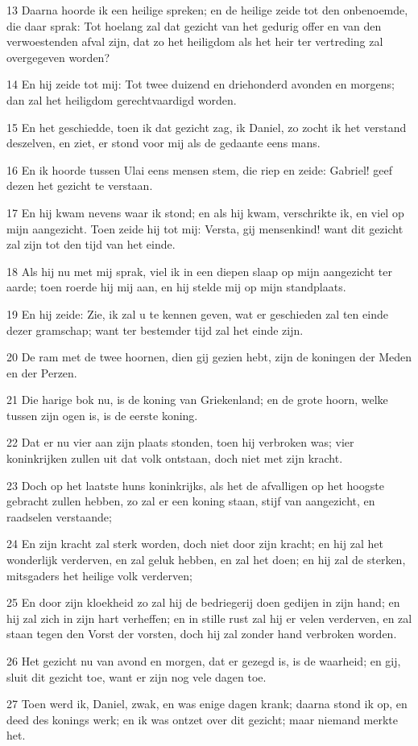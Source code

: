 \par 13 Daarna hoorde ik een heilige spreken; en de heilige zeide tot den onbenoemde, die daar sprak: Tot hoelang zal dat gezicht van het gedurig offer en van den verwoestenden afval zijn, dat zo het heiligdom als het heir ter vertreding zal overgegeven worden?
\par 14 En hij zeide tot mij: Tot twee duizend en driehonderd avonden en morgens; dan zal het heiligdom gerechtvaardigd worden.
\par 15 En het geschiedde, toen ik dat gezicht zag, ik Daniel, zo zocht ik het verstand deszelven, en ziet, er stond voor mij als de gedaante eens mans.
\par 16 En ik hoorde tussen Ulai eens mensen stem, die riep en zeide: Gabriel! geef dezen het gezicht te verstaan.
\par 17 En hij kwam nevens waar ik stond; en als hij kwam, verschrikte ik, en viel op mijn aangezicht. Toen zeide hij tot mij: Versta, gij mensenkind! want dit gezicht zal zijn tot den tijd van het einde.
\par 18 Als hij nu met mij sprak, viel ik in een diepen slaap op mijn aangezicht ter aarde; toen roerde hij mij aan, en hij stelde mij op mijn standplaats.
\par 19 En hij zeide: Zie, ik zal u te kennen geven, wat er geschieden zal ten einde dezer gramschap; want ter bestemder tijd zal het einde zijn.
\par 20 De ram met de twee hoornen, dien gij gezien hebt, zijn de koningen der Meden en der Perzen.
\par 21 Die harige bok nu, is de koning van Griekenland; en de grote hoorn, welke tussen zijn ogen is, is de eerste koning.
\par 22 Dat er nu vier aan zijn plaats stonden, toen hij verbroken was; vier koninkrijken zullen uit dat volk ontstaan, doch niet met zijn kracht.
\par 23 Doch op het laatste huns koninkrijks, als het de afvalligen op het hoogste gebracht zullen hebben, zo zal er een koning staan, stijf van aangezicht, en raadselen verstaande;
\par 24 En zijn kracht zal sterk worden, doch niet door zijn kracht; en hij zal het wonderlijk verderven, en zal geluk hebben, en zal het doen; en hij zal de sterken, mitsgaders het heilige volk verderven;
\par 25 En door zijn kloekheid zo zal hij de bedriegerij doen gedijen in zijn hand; en hij zal zich in zijn hart verheffen; en in stille rust zal hij er velen verderven, en zal staan tegen den Vorst der vorsten, doch hij zal zonder hand verbroken worden.
\par 26 Het gezicht nu van avond en morgen, dat er gezegd is, is de waarheid; en gij, sluit dit gezicht toe, want er zijn nog vele dagen toe.
\par 27 Toen werd ik, Daniel, zwak, en was enige dagen krank; daarna stond ik op, en deed des konings werk; en ik was ontzet over dit gezicht; maar niemand merkte het.

